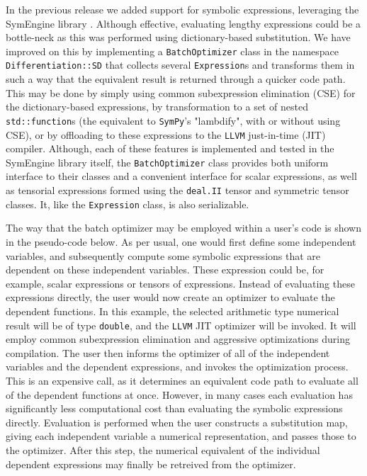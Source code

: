 \documentclass{ansarticle-preprint}
\begin{document}
In the previous release we added support for symbolic expressions, leveraging the
SymEngine library \cite{symengine-web-page}.
Although effective, evaluating lengthy expressions could be a bottle-neck as this
was performed using dictionary-based substitution.
We have improved on this by implementing a \texttt{BatchOptimizer} class in the 
namespace \texttt{Differentiation::SD} that collects several \texttt{Expression}s
and transforms them in such a way that the equivalent result is returned through
a quicker code path.
This may be done by simply using common subexpression elimination (CSE) for the
dictionary-based expressions, by transformation to a set of nested 
\texttt{std::function}s (the equivalent to \texttt{SymPy}'s "lambdify", with or
without using CSE), or by offloading to these expressions to the \texttt{LLVM}
just-in-time (JIT) compiler.
Although, each of these features is implemented and tested in the SymEngine
library itself, the \texttt{BatchOptimizer} class provides both uniform
interface to their classes and a convenient interface for scalar expressions,
as well as tensorial expressions formed using the \texttt{deal.II} tensor and 
symmetric tensor classes.
It, like the \texttt{Expression} class, is also serializable.

The way that the batch optimizer may be employed within a user's code is shown
in the pseudo-code below.
As per usual, one would first define some independent variables, and 
subsequently compute some symbolic expressions that are dependent on these 
independent variables. 
These expression could be, for example, scalar  expressions or tensors of 
expressions.
Instead of evaluating these expressions directly, the user would now create an
optimizer to evaluate the dependent functions.
In this example, the selected arithmetic type numerical result will be of type
\texttt{double}, and the \texttt{LLVM} JIT optimizer will be invoked.
It will employ common subexpression elimination and aggressive optimizations
during compilation.
The user then informs the optimizer of all of the independent variables and the
dependent expressions, and invokes the optimization process.
This is an expensive call, as it determines an equivalent code path to evaluate
all of the dependent functions at once.
However, in many cases each evaluation has significantly less computational cost
than evaluating the symbolic expressions directly.
Evaluation is performed when the user constructs a substitution map, giving each
independent variable a numerical representation, and passes those to the 
optimizer.
After this step, the numerical equivalent of the individual dependent expressions
may finally be retreived from the optimizer.
\end{document}
